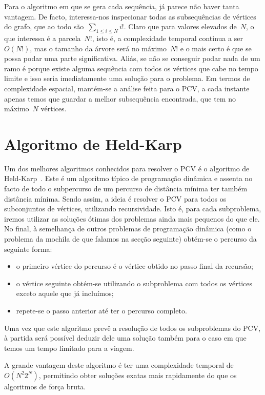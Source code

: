 \documentclass[12pt,a4paper,reqno]{report}
\numberwithin{figure}{section}
\numberwithin{equation}{section}
\begin{document}
Para o algoritmo em que se gera cada sequência, já parece não haver tanta vantagem. De facto, interessa-nos inspecionar todas as subsequências de vértices do grafo, que ao todo são~$\sum_{1 \leq i \leq N} i!$. Claro que para valores elevados de~$N$, o que interessa é a parcela~$N!$, isto é, a complexidade temporal continua a ser~$O(N!)$, mas o tamanho da árvore será no máximo~$N!$ e o mais certo é que se possa podar uma parte significativa. Aliás, se não se conseguir podar nada de um ramo é porque existe alguma sequência com todos os vértices que cabe no tempo limite e isso seria imediatamente uma solução para o problema. Em termos de complexidade espacial, mantém-se a análise feita para o PCV, a cada instante apenas temos que guardar a melhor subsequência encontrada, que tem no máximo~$N$ vértices.

\section{Algoritmo de Held-Karp}

Um dos melhores algoritmos conhecidos para resolver o PCV é o algoritmo de Held-Karp~\cite{Held&Karp:1962}. Este é um algoritmo típico de programação dinâmica e assenta no facto de todo o subpercurso de um percurso de distância mínima ter também distância mínima. Sendo assim, a ideia é resolver o PCV para todos os subconjuntos de vértices, utilizando recursividade. Isto é, para cada subproblema, iremos utilizar as soluções ótimas dos problemas ainda mais pequenos do que ele. No final, à semelhança de outros problemas de programação dinâmica (como o problema da mochila de que falamos na secção seguinte) obtém-se o percurso da seguinte forma:
\begin{itemize}
	\item o primeiro vértice do percurso é o vértice obtido no passo final da recursão;
	\item o vértice seguinte obtém-se utilizando o subproblema com todos os vértices exceto aquele que já incluímos;
	\item repete-se o passo anterior até ter o percurso completo.
\end{itemize}

Uma vez que este algoritmo prevê a resolução de todos os subproblemas do PCV, à partida será possível deduzir dele uma solução também para o caso em que temos um tempo limitado para a viagem.

A grande vantagem deste algoritmo é ter uma complexidade temporal de~$O(N^2 2^N)$, permitindo obter soluções exatas mais rapidamente do que os algoritmos de força bruta.
\end{document}
